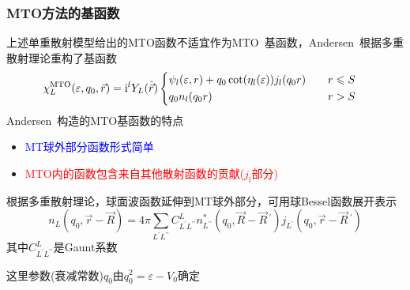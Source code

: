 \documentclass[cjk,slidestop,compress,mathserif,blue]{beamer}
\begin{document}
\frame
{
\frametitle{\textrm{MTO}方法的基函数}
%
上述单重散射模型给出的\textrm{MTO}函数不适宜作为\textrm{MTO~}基函数，\textrm{Andersen~}根据多重散射理论重构了基函数
		\begin{displaymath}
			\hspace*{-10pt}\chi_L^{\mathrm{MTO}}(\varepsilon,q_0,\vec r)=\mathrm{i}^lY_L(\hat{\vec r})\left\{
			\begin{aligned}
				&\psi_l(\varepsilon,r)+q_0\cot(\eta_l(\varepsilon))j_l(q_0r)&\quad r\leqslant S\\
				&q_0n_l(q_0r)&\quad r>S
			\end{aligned}\right.
		\end{displaymath}
		\textrm{Andersen~}构造的\textrm{MTO}基函数的特点
		\begin{itemize}
			\item \textcolor{blue}{\textrm{MT}球外部分函数形式简单}
			\item \textcolor{red}{\textrm{MTO}内的函数包含来自其他散射函数的贡献($j_l$部分)}
		\end{itemize}
		根据多重散射理论，球面波函数延伸到\textrm{MT}球外部分，可用球\textrm{Bessel}函数展开表示
		\begin{displaymath}
			n_L(q_0,\vec r-\vec R)=4\pi\sum_{L^{\prime}L^{\prime\prime}}C_{L^{\prime}L^{\prime\prime}}^Ln_{L^{\prime\prime}}^{\ast}(q_0,\vec R-\vec R\,^{\prime})j_{L^{\prime}}(q_0,\vec r-\vec R\,^{\prime})
		\end{displaymath}
		其中$C_{L^{\prime}L^{\prime\prime}}^L$是\textrm{Gaunt}系数


		这里参数(衰减常数)$q_0$由$q_0^2=\varepsilon-V_0$确定
}
\end{document}
